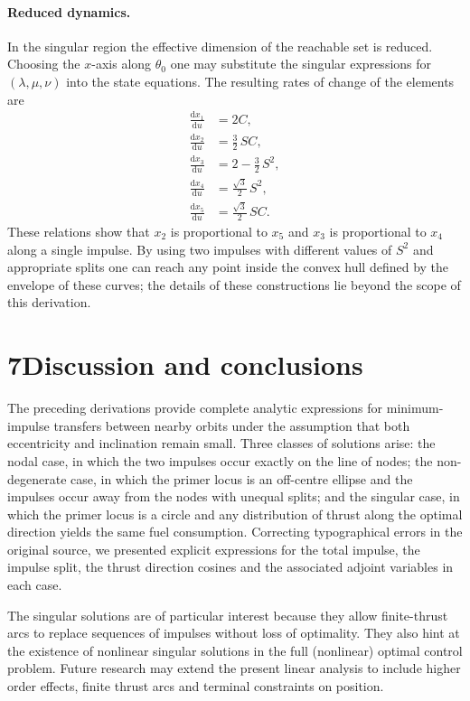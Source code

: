\documentclass[12pt]{article}
\begin{document}
\paragraph{Reduced dynamics.}  In the singular region the effective
dimension of the reachable set is reduced.  Choosing the $x$-axis
along $\theta_0$ one may substitute the singular expressions for
$(\lambda,\mu,\nu)$ into the state equations.  The resulting rates of
change of the elements are
\begin{align}
  \frac{\mathrm{d}x_1}{\mathrm{d}u} &= 2C,
    \tag{C4}\label{eq:singular-dx1}\\
  \frac{\mathrm{d}x_2}{\mathrm{d}u} &= \frac{3}{2}\,S C,
    \tag{C5}\label{eq:singular-dx2}\\
  \frac{\mathrm{d}x_3}{\mathrm{d}u} &= 2 - \frac{3}{2}\,S^2,
    \tag{C6}\label{eq:singular-dx3}\\
  \frac{\mathrm{d}x_4}{\mathrm{d}u} &= \frac{\sqrt{3}}{2}\,S^2,
    \tag{C7}\label{eq:singular-dx4}\\
  \frac{\mathrm{d}x_5}{\mathrm{d}u} &= \frac{\sqrt{3}}{2}\,S C.
    \tag{C8}\label{eq:singular-dx5}
\end{align}
These relations show that $x_2$ is proportional to $x_5$ and $x_3$ is
proportional to $x_4$ along a single impulse.  By using two impulses
with different values of $S^2$ and appropriate splits one can reach
any point inside the convex hull defined by the envelope of these
curves; the details of these constructions lie beyond the scope of
this derivation.

\section*{7\quad Discussion and conclusions}

The preceding derivations provide complete analytic expressions for
minimum-impulse transfers between nearby orbits under the assumption
that both eccentricity and inclination remain small.  Three classes of
solutions arise: the nodal case, in which the two impulses occur
exactly on the line of nodes; the non-degenerate case, in which the
primer locus is an off-centre ellipse and the impulses occur away
from the nodes with unequal splits; and the singular case, in which
the primer locus is a circle and any distribution of thrust along the
optimal direction yields the same fuel consumption.  Correcting
typographical errors in the original source, we presented explicit
expressions for the total impulse, the impulse split, the thrust
direction cosines and the associated adjoint variables in each case.

The singular solutions are of particular interest because they allow
finite-thrust arcs to replace sequences of impulses without loss of
optimality.  They also hint at the existence of nonlinear singular
solutions in the full (nonlinear) optimal control problem.  Future
research may extend the present linear analysis to include higher
order effects, finite thrust arcs and terminal constraints on
position.
\end{document}
